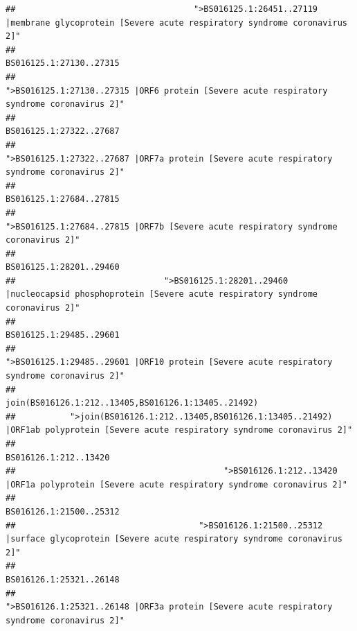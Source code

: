 \documentclass[
]{article}
\begin{document}
\begin{verbatim}
##                                    ">BS016125.1:26451..27119 |membrane glycoprotein [Severe acute respiratory syndrome coronavirus 2]" 
##                                                                                                                BS016125.1:27130..27315 
##                                             ">BS016125.1:27130..27315 |ORF6 protein [Severe acute respiratory syndrome coronavirus 2]" 
##                                                                                                                BS016125.1:27322..27687 
##                                            ">BS016125.1:27322..27687 |ORF7a protein [Severe acute respiratory syndrome coronavirus 2]" 
##                                                                                                                BS016125.1:27684..27815 
##                                                    ">BS016125.1:27684..27815 |ORF7b [Severe acute respiratory syndrome coronavirus 2]" 
##                                                                                                                BS016125.1:28201..29460 
##                              ">BS016125.1:28201..29460 |nucleocapsid phosphoprotein [Severe acute respiratory syndrome coronavirus 2]" 
##                                                                                                                BS016125.1:29485..29601 
##                                            ">BS016125.1:29485..29601 |ORF10 protein [Severe acute respiratory syndrome coronavirus 2]" 
##                                                                                    join(BS016126.1:212..13405,BS016126.1:13405..21492) 
##           ">join(BS016126.1:212..13405,BS016126.1:13405..21492) |ORF1ab polyprotein [Severe acute respiratory syndrome coronavirus 2]" 
##                                                                                                                  BS016126.1:212..13420 
##                                          ">BS016126.1:212..13420 |ORF1a polyprotein [Severe acute respiratory syndrome coronavirus 2]" 
##                                                                                                                BS016126.1:21500..25312 
##                                     ">BS016126.1:21500..25312 |surface glycoprotein [Severe acute respiratory syndrome coronavirus 2]" 
##                                                                                                                BS016126.1:25321..26148 
##                                            ">BS016126.1:25321..26148 |ORF3a protein [Severe acute respiratory syndrome coronavirus 2]" 

\end{verbatim}
\end{document}
